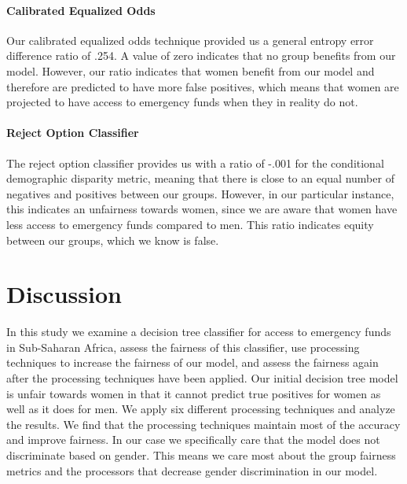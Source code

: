 \documentclass[water,article,submit,moreauthors,pdftex]{mdpi}
\begin{document}
\hypertarget{calibrated-equalized-odds}{%
\paragraph{Calibrated Equalized Odds}\label{calibrated-equalized-odds}}

Our calibrated equalized odds technique provided us a general entropy
error difference ratio of .254. A value of zero indicates that no group
benefits from our model. However, our ratio indicates that women benefit
from our model and therefore are predicted to have more false positives,
which means that women are projected to have access to emergency funds
when they in reality do not.

\hypertarget{reject-option-classifier}{%
\paragraph{Reject Option Classifier}\label{reject-option-classifier}}

The reject option classifier provides us with a ratio of -.001 for the
conditional demographic disparity metric, meaning that there is close to
an equal number of negatives and positives between our groups. However,
in our particular instance, this indicates an unfairness towards women,
since we are aware that women have less access to emergency funds
compared to men. This ratio indicates equity between our groups, which
we know is false.

\hypertarget{discussion}{%
\section{Discussion}\label{discussion}}

In this study we examine a decision tree classifier for access to
emergency funds in Sub-Saharan Africa, assess the fairness of this
classifier, use processing techniques to increase the fairness of our
model, and assess the fairness again after the processing techniques
have been applied. Our initial decision tree model is unfair towards
women in that it cannot predict true positives for women as well as it
does for men. We apply six different processing techniques and analyze
the results. We find that the processing techniques maintain most of the
accuracy and improve fairness. In our case we specifically care that the
model does not discriminate based on gender. This means we care most
about the group fairness metrics and the processors that decrease gender
discrimination in our model.
\end{document}
